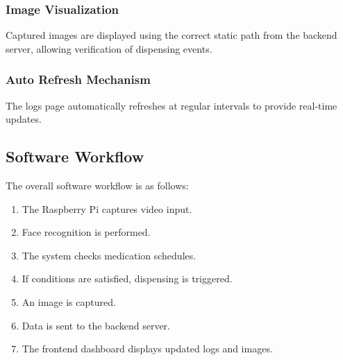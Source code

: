 \subsubsection{Image Visualization}

Captured images are displayed using the correct static path from the backend server, allowing verification of dispensing events.

\subsubsection{Auto Refresh Mechanism}

The logs page automatically refreshes at regular intervals to provide real-time updates.

\subsection{Software Workflow}

The overall software workflow is as follows:

\begin{enumerate}
    \item The Raspberry Pi captures video input.
    \item Face recognition is performed.
    \item The system checks medication schedules.
    \item If conditions are satisfied, dispensing is triggered.
    \item An image is captured.
    \item Data is sent to the backend server.
    \item The frontend dashboard displays updated logs and images.
\end{enumerate}